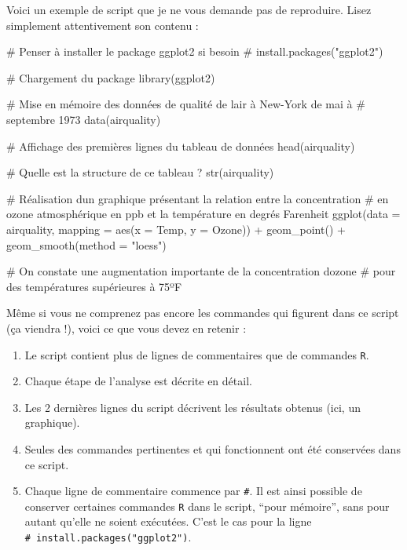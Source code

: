\documentclass[
  a4paper,
  DIV=11,
  numbers=noendperiod,
  oneside]{scrreprt}
\newenvironment{Shaded}{}{}
\newcommand{\AttributeTok}[1]{\textcolor[rgb]{0.84,0.23,0.29}{#1}}
\newcommand{\CommentTok}[1]{\textcolor[rgb]{0.42,0.45,0.49}{#1}}
\newcommand{\FunctionTok}[1]{\textcolor[rgb]{0.44,0.26,0.76}{#1}}
\newcommand{\NormalTok}[1]{\textcolor[rgb]{0.14,0.16,0.18}{#1}}
\newcommand{\SpecialCharTok}[1]{\textcolor[rgb]{0.00,0.36,0.77}{#1}}
\newcommand{\StringTok}[1]{\textcolor[rgb]{0.01,0.18,0.38}{#1}}
\providecommand{\tightlist}{%
  \setlength{\itemsep}{0pt}\setlength{\parskip}{0pt}}\usepackage{longtable,booktabs,array}
\begin{document}
Voici un exemple de script que je ne vous demande pas de reproduire.
Lisez simplement attentivement son contenu :

\begin{Shaded}
\begin{Highlighting}[]
\CommentTok{\# Penser à installer le package ggplot2 si besoin}
\CommentTok{\# install.packages("ggplot2")}

\CommentTok{\# Chargement du package}
\FunctionTok{library}\NormalTok{(ggplot2)}

\CommentTok{\# Mise en mémoire des données de qualité de l\textquotesingle{}air à New{-}York de mai à}
\CommentTok{\# septembre 1973}
\FunctionTok{data}\NormalTok{(airquality)}

\CommentTok{\# Affichage des premières lignes du tableau de données}
\FunctionTok{head}\NormalTok{(airquality)}

\CommentTok{\# Quelle est la structure de ce tableau ?}
\FunctionTok{str}\NormalTok{(airquality)}

\CommentTok{\# Réalisation d\textquotesingle{}un graphique présentant la relation entre la concentration}
\CommentTok{\# en ozone atmosphérique en ppb et la température en degrés Farenheit}
\FunctionTok{ggplot}\NormalTok{(}\AttributeTok{data =}\NormalTok{ airquality, }\AttributeTok{mapping =} \FunctionTok{aes}\NormalTok{(}\AttributeTok{x =}\NormalTok{ Temp, }\AttributeTok{y =}\NormalTok{ Ozone)) }\SpecialCharTok{+}
  \FunctionTok{geom\_point}\NormalTok{() }\SpecialCharTok{+}
  \FunctionTok{geom\_smooth}\NormalTok{(}\AttributeTok{method =} \StringTok{"loess"}\NormalTok{)}

\CommentTok{\# On constate une augmentation importante de la concentration d\textquotesingle{}ozone }
\CommentTok{\# pour des températures supérieures à 75ºF}
\end{Highlighting}
\end{Shaded}

Même si vous ne comprenez pas encore les commandes qui figurent dans ce
script (ça viendra !), voici ce que vous devez en retenir :

\begin{enumerate}
\def\labelenumi{\arabic{enumi}.}
\tightlist
\item
  Le script contient plus de lignes de commentaires que de commandes
  \texttt{R}.
\item
  Chaque étape de l'analyse est décrite en détail.
\item
  Les 2 dernières lignes du script décrivent les résultats obtenus (ici,
  un graphique).
\item
  Seules des commandes pertinentes et qui fonctionnent ont été
  conservées dans ce script.
\item
  Chaque ligne de commentaire commence par \texttt{\#}. Il est ainsi
  possible de conserver certaines commandes \texttt{R} dans le script,
  ``pour mémoire'', sans pour autant qu'elle ne soient exécutées. C'est
  le cas pour la ligne \texttt{\#\ install.packages("ggplot2")}.
\end{enumerate}
\end{document}
